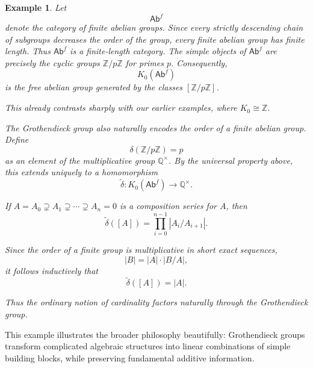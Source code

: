 \documentclass[12pt,reqno]{amsart}
\theoremstyle{plain}
\newtheorem*{ex}{Example}
\numberwithin{equation}{section}
\begin{document}
\begin{ex}\label{ex: Abf}
Let
\[
\mathsf{Ab}^f
\]
denote the category of finite abelian groups.
Since every strictly descending chain of subgroups decreases the order of the group, every finite abelian group has finite length. Thus $\mathsf{Ab}^f$ is a finite-length category.
The simple objects of $\mathsf{Ab}^f$ are precisely the cyclic groups $\mathbb Z/p\mathbb Z$ for primes $p$. Consequently,
\[
K_0(\mathsf{Ab}^f)
\]
is the free abelian group generated by the classes $[\mathbb Z/p\mathbb Z]$.

This already contrasts sharply with our earlier examples, where $K_0\cong \mathbb Z$.

The Grothendieck group also naturally encodes the order of a finite abelian group. Define
\[
\delta(\mathbb Z/p\mathbb Z)=p
\]
as an element of the multiplicative group $\mathbb Q^\times$. By the universal property above, this extends uniquely to a homomorphism
\[
\widetilde{\delta}:
K_0(\mathsf{Ab}^f)\to \mathbb Q^\times.
\]

If $A=A_0\supsetneq A_1\supsetneq \cdots \supsetneq A_n=0$ is a composition series for $A$, then
\[
\widetilde{\delta}([A])
=
\prod_{i=0}^{n-1}|A_i/A_{i+1}|.
\]

Since the order of a finite group is multiplicative in short exact sequences,
\[
|B|=|A|\cdot |B/A|,
\]
it follows inductively that
\[
\widetilde{\delta}([A])=|A|.
\]

Thus the ordinary notion of cardinality factors naturally through the Grothendieck group.
\end{ex}


\medskip
This example illustrates the broader philosophy beautifully: Grothendieck groups transform complicated algebraic structures into linear combinations of simple building blocks, while preserving fundamental additive information.
\end{document}
